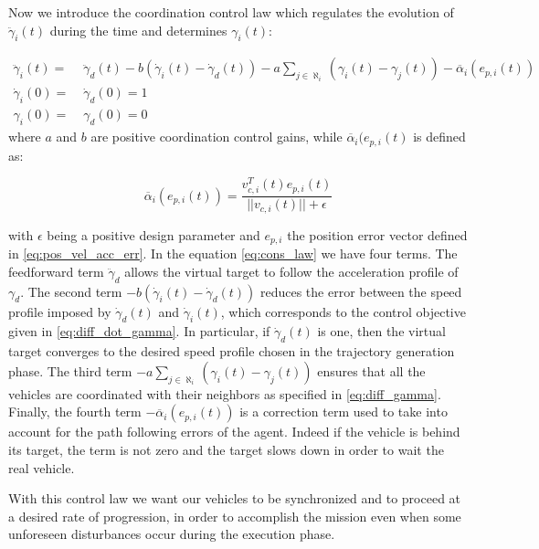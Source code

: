 Now we introduce the coordination control law which regulates the evolution of
$\ddot{\gamma}_i(t)$ during the time and determines $\gamma_i(t)$:

\begin{equation} \label{eq:cons_law}
  \begin{aligned}
    \ddot{\gamma}_i(t) = & \; \ddot{\gamma}_d(t) - b (\dot{\gamma}_i(t) - \dot{\gamma}_d(t)) - a \sum_{j \in \aleph_i} (\gamma_i(t) - \gamma_j(t)) - \overline{\alpha}_i (e_{p,i}(t)) \\
    \dot{\gamma}_i(0) = & \; \dot{\gamma}_d(0) = 1 \\
    \gamma_i(0) = & \; \gamma_d(0) = 0
  \end{aligned}
\end{equation}
where $a$ and $b$ are positive coordination control gains, while $\overline{\alpha}_i (e_{p,i}(t)$
is defined as:

\begin{equation} \label{eq:error_term}
  \overline{\alpha}_i (e_{p,i}(t)) = \frac{v_{c,i}^T(t) e_{p,i}(t)}{||v_{c,i}(t)|| + \epsilon}
\end{equation}

with $\epsilon$ being a positive design parameter and $e_{p,i}$ the position
error vector defined in \eqref{eq:pos_vel_acc_err}.
In the equation \eqref{eq:cons_law} we have four terms. The feedforward term
$\ddot{\gamma}_d$ allows the virtual target to follow the acceleration profile of
$\gamma_d$.
The second term $- b (\dot{\gamma}_i(t) - \dot{\gamma}_d(t))$ reduces the error
between the speed profile imposed by $\dot{\gamma}_d(t)$ and $\dot{\gamma}_i(t)$,
which corresponds to the control objective given in \eqref{eq:diff_dot_gamma}.
In particular, if $\dot{\gamma}_d(t)$ is one, then the virtual target converges
to the desired speed profile chosen in the trajectory generation phase.
The third term $- a \sum_{j \in \aleph_i} (\gamma_i(t) - \gamma_j(t))$ ensures that
all the vehicles are coordinated with their neighbors as specified in \eqref{eq:diff_gamma}.
Finally, the fourth term $- \overline{\alpha}_i (e_{p,i}(t))$ is a correction term
used to take into account for the path following errors of the agent. Indeed if the
vehicle is behind its target, the term is not zero and the target slows down in order
to wait the real vehicle.

With this control law we want our vehicles to be synchronized and to proceed at
a desired rate of progression, in order to accomplish the mission even when
some unforeseen disturbances occur during the execution phase.
